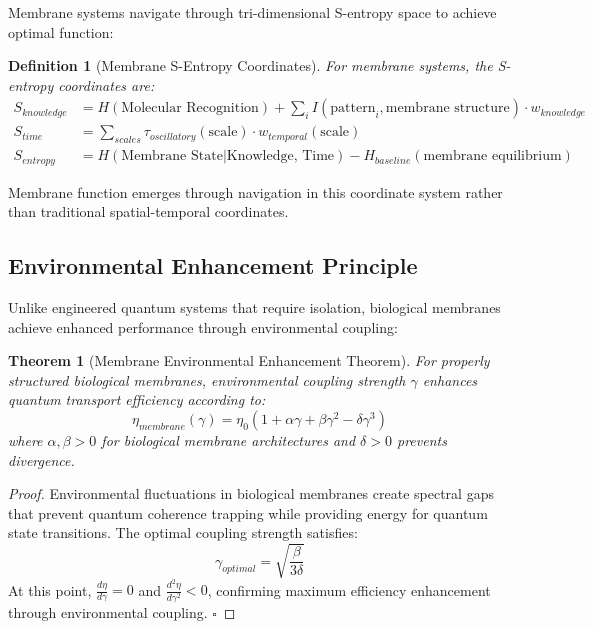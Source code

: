 \documentclass[12pt,a4paper]{article}
\newtheorem{theorem}{Theorem}
\newtheorem{definition}{Definition}
\begin{document}
Membrane systems navigate through tri-dimensional S-entropy space to achieve optimal function:

\begin{definition}[Membrane S-Entropy Coordinates]
For membrane systems, the S-entropy coordinates are:
\begin{align}
S_{knowledge} &= H(\text{Molecular Recognition}) + \sum_i I(\text{pattern}_i, \text{membrane structure}) \cdot w_{knowledge} \\
S_{time} &= \sum_{scales} \tau_{oscillatory}(\text{scale}) \cdot w_{temporal}(\text{scale}) \\
S_{entropy} &= H(\text{Membrane State}|\text{Knowledge, Time}) - H_{baseline}(\text{membrane equilibrium})
\end{align}
\end{definition}

Membrane function emerges through navigation in this coordinate system rather than traditional spatial-temporal coordinates.

\subsection{Environmental Enhancement Principle}

Unlike engineered quantum systems that require isolation, biological membranes achieve enhanced performance through environmental coupling:

\begin{theorem}[Membrane Environmental Enhancement Theorem]
For properly structured biological membranes, environmental coupling strength $\gamma$ enhances quantum transport efficiency according to:
\begin{equation}
\eta_{membrane}(\gamma) = \eta_0 \left(1 + \alpha\gamma + \beta\gamma^2 - \delta\gamma^3\right)
\end{equation}
where $\alpha, \beta > 0$ for biological membrane architectures and $\delta > 0$ prevents divergence.
\end{theorem}

\begin{proof}
Environmental fluctuations in biological membranes create spectral gaps that prevent quantum coherence trapping while providing energy for quantum state transitions. The optimal coupling strength satisfies:
\begin{equation}
\gamma_{optimal} = \sqrt{\frac{\beta}{3\delta}}
\end{equation}
At this point, $\frac{d\eta}{d\gamma} = 0$ and $\frac{d^2\eta}{d\gamma^2} < 0$, confirming maximum efficiency enhancement through environmental coupling. $\square$
\end{proof}
\end{document}
